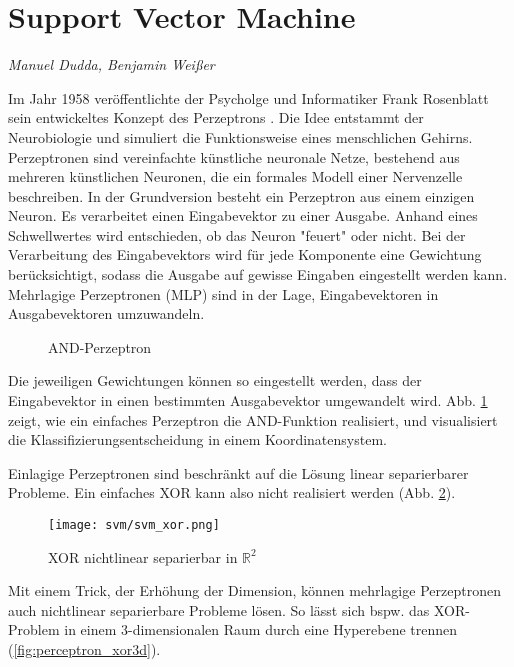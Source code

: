 \section{Support Vector Machine}
\label{mainsec:svm}
\textit{Manuel Dudda, Benjamin Weißer}

Im Jahr 1958 veröffentlichte der Psycholge und Informatiker Frank Rosenblatt sein entwickeltes Konzept des Perzeptrons \cite{rosenblatt58a}. 
Die Idee entstammt der Neurobiologie und simuliert die Funktionsweise eines menschlichen Gehirns. 
Perzeptronen sind vereinfachte künstliche neuronale Netze, bestehend aus mehreren künstlichen Neuronen, die ein formales Modell einer Nervenzelle beschreiben. 
In der Grundversion besteht ein Perzeptron aus einem einzigen Neuron. 
Es verarbeitet einen Eingabevektor zu einer Ausgabe. 
Anhand eines Schwellwertes wird entschieden, ob das Neuron "{}feuert"{} oder nicht. 
Bei der Verarbeitung des Eingabevektors wird für jede Komponente eine Gewichtung berücksichtigt, sodass die Ausgabe auf gewisse Eingaben eingestellt werden kann. 
Mehrlagige Perzeptronen (\ac{MLP}) sind in der Lage, Eingabevektoren in Ausgabevektoren umzuwandeln. 

\begin{figure}[htbp] \centering
    \caption{AND-Perzeptron}
    \label{fig:perceptron_and}
\end{figure}

Die jeweiligen Gewichtungen können so eingestellt werden, dass der Eingabevektor in einen bestimmten Ausgabevektor umgewandelt wird. 
Abb. \ref{fig:perceptron_and} zeigt, wie ein einfaches Perzeptron die AND-Funktion realisiert, und visualisiert die Klassifizierungsentscheidung in einem Koordinatensystem. 

Einlagige Perzeptronen sind beschränkt auf die Lösung linear separierbarer Probleme. 
Ein einfaches XOR kann also nicht realisiert werden (Abb. \ref{fig:perceptron_xor}). 

\begin{figure}[htbp] \centering
    \texttt{[image: svm/svm\_xor.png]}
    \caption{XOR nichtlinear separierbar in $\mathbb{R}^2$}
    \label{fig:perceptron_xor}
\end{figure}


Mit einem Trick, der Erhöhung der Dimension, können mehrlagige Perzeptronen auch nichtlinear separierbare Probleme lösen. 
So lässt sich bspw. das XOR-Problem in einem 3-dimensionalen Raum durch eine Hyperebene trennen (\ref{fig:perceptron_xor3d}).

